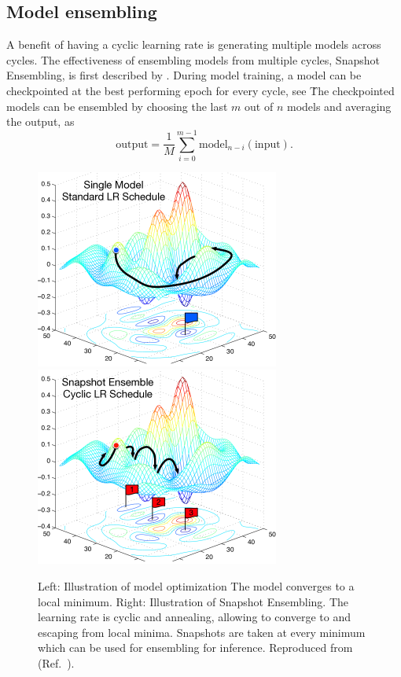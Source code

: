 \subsection{Model ensembling}\label{subsec:model_ensembling}
A benefit of having a cyclic learning rate is generating multiple models across cycles.
The effectiveness of ensembling models from multiple cycles, Snapshot Ensembling, is first described by \textcite{Huang2017}.
During model training, a model can be checkpointed at the best performing epoch for every cycle, see \.
The checkpointed models can be ensembled by choosing the last $m$ out of $n$ models and averaging the output, as
\begin{equation}
    \mathrm{output} = \frac{1}{M} \sum_{i=0}^{m-1} \mathrm{model}_{n-i}(\mathrm{input}).
\end{equation}
\begin{figure}
    \centering
    \includegraphics[width=0.48\linewidth]{ANN/images/ensembling_huang_left.png}
    \includegraphics[width=0.48\linewidth]{ANN/images/ensembling_huang_right.png}
    \caption[Snapshot ensembling]{
        Left: Illustration of model optimization The model converges to a local minimum.
        Right: Illustration of Snapshot Ensembling.
        The learning rate is cyclic and annealing, allowing to converge to and escaping from local minima.
        Snapshots are taken at every minimum which can be used for ensembling for inference.
        Reproduced from  (Ref.~\cite{Huang2017}).
    }
\end{figure}


